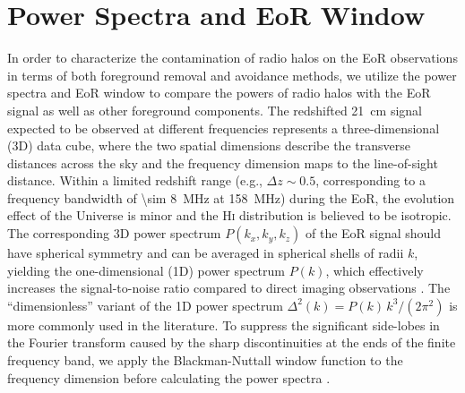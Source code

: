 \documentclass[modern]{aastex62}
\newcommand{\Hi}{H\textsc{i}}
\begin{document}
\section{Power Spectra and EoR Window}
\label{sec:ps-eorw}

In order to characterize the contamination of radio halos on the EoR
observations in terms of both foreground removal and avoidance methods,
we utilize the power spectra and EoR window to compare the powers of
radio halos with the EoR signal as well as other foreground components.
The redshifted 21~cm signal expected to be observed at different
frequencies represents a three-dimensional (3D) data cube, where the
two spatial dimensions describe the transverse distances across the sky
and the frequency dimension maps to the line-of-sight distance.
Within a limited redshift range (e.g., $\Delta z \sim 0.5$, corresponding
to a frequency bandwidth of \SI{\sim 8}{\MHz} at \SI{158}{\MHz})
during the EoR, the evolution effect of the Universe is minor and the
\Hi{} distribution is believed to be isotropic.
The corresponding 3D power spectrum $P(k_x, k_y, k_z)$ of the EoR signal
should have spherical symmetry and can be averaged in spherical shells
of radii $k$, yielding the one-dimensional (1D) power spectrum $P(k)$,
which effectively increases the signal-to-noise ratio compared to
direct imaging observations \citep{morales2004,morales2006,datta2010}.
The \enquote{dimensionless} variant of the 1D power spectrum
$\Delta^2(k) = P(k) \,k^3 / (2\pi^2)$
is more commonly used in the literature.
To suppress the significant side-lobes in the Fourier transform caused
by the sharp discontinuities at the ends of the finite frequency band,
we apply the Blackman-Nuttall window function to the frequency dimension
before calculating the power spectra \citep[e.g.,][]{trott2015,chapman2016}.
\end{document}
